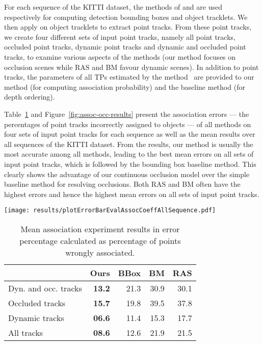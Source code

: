 For each sequence of the KITTI dataset, the methods of \cite{} and \cite{} are used respectively for computing detection bounding boxes and object tracklets. We then apply \cite{} on object tracklets to extract point tracks. From these point tracks, we create four different sets of input point tracks, namely all point tracks, occluded point tracks, dynamic point tracks and dynamic and occluded point tracks, to examine various aspects of the methods (our method focuses on occlusion scenes while RAS and BM favour dynamic scenes). In addition to point tracks, the parameters of all TPs estimated by the method~\cite{Song_Chandraker_2014} are provided to our method (for computing association probability) and the baseline method (for depth ordering).

Table~\ref{tab:meanAssoc} and Figure~\ref{fig:assoc-occ-results} present the association errors --- the percentages of point tracks incorrectly assigned to objects --- of all methods on four sets of input point tracks for each sequence as well as the mean results over all sequences of the KITTI dataset. From the results, our method is usually the most accurate among all methods, leading to the best mean errors on all sets of input point tracks, which is followed by the bounding box baseline method. This clearly shows the advantage of our continuous occlusion model over the simple baseline method for resolving occlusions. Both RAS and BM often have the highest errors and hence the highest mean errors on all sets of input point tracks.

\begin{figure*}
\texttt{[image: results/plotErrorBarEvalAssocCoeffAllSequence.pdf]}
  \caption{Association errors on different sets of point tracks. The
    numbers on y-axis represent the data sequence number in KITTI dataset. The
    first set of bars in each plot correspond to the mean across all sequences.
    The error is in terms of average fraction of foreground points incorrectly
    associated to objects per sequence.}
\label{fig:assoc-occ-results}
\end{figure*}
\begin{table}
\begin{tabular}{lrrrr}
  \toprule
  & Ours & BBox & BM & RAS\\
  \midrule
  Dyn. and occ. tracks        & \textbf{13.2} & 21.3 & 30.9 & 30.1 \\
  Occluded tracks             & \textbf{15.7} & 19.8 & 39.5 & 37.8 \\
  Dynamic tracks              & \textbf{06.6} & 11.4 & 15.3 & 17.7 \\
  All tracks                  & \textbf{08.6} & 12.6 & 21.9 & 21.5 \\
  \bottomrule
\end{tabular}
\caption{Mean association experiment results in error percentage calculated as percentage of points wrongly associated.}
\label{tab:meanAssoc}
\end{table}


